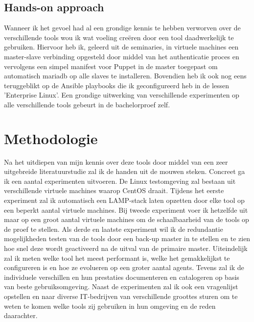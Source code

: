 \documentclass[fleqn,10pt]{voorstel}
\begin{document}
\subsection{Hands-on approach}
Wanneer ik het gevoel had al een grondige kennis te hebben verworven over de verschillende tools wou ik wat voeling creëren door een tool daadwerkelijk te gebruiken. Hiervoor heb ik, geleerd uit de seminaries, in virtuele machines een master-slave verbinding opgesteld door middel van het authenticatie proces en vervolgens een simpel manifest voor Puppet in de master toegepast om automatisch mariadb op alle slaves te installeren. Bovendien heb ik ook nog eens teruggeblikt op de Ansible playbooks die ik geconfigureerd heb in de lessen 'Enterprise Linux'. Een grondige uitwerking van verschillende experimenten op alle verschillende tools gebeurt in de bachelorproef zelf.


\section{Methodologie}
\label{sec:methodologie}

Na het uitdiepen van mijn kennis over deze tools door middel van een zeer uitgebreide literatuurstudie zal ik de handen uit de mouwen steken. Concreet ga ik een aantal experimenten uitvoeren. De Linux testomgeving zal bestaan uit verschillende virtuele machines waarop CentOS draait. Tijdens het eerste experiment zal ik automatisch een LAMP-stack laten opzetten door elke tool op een beperkt aantal virtuele machines. Bij tweede experiment voer ik hetzelfde uit maar op een groot aantal virtuele machines om de schaalbaarheid van de tools op de proef te stellen. Als derde en laatste experiment wil ik de redundantie mogelijkheden testen van de tools door een back-up master in te stellen en te zien hoe snel deze wordt geactiveerd na de uitval van de primaire master. Uiteindelijk zal ik meten welke tool het meest performant is, welke het gemakkelijkst te configureren is en hoe ze evolueren op een groter aantal agents. Tevens zal ik de individuele verschillen en hun prestaties documenteren en catalogeren op basis van beste gebruiksomgeving. Naast de experimenten zal ik ook een vragenlijst opstellen en naar diverse IT-bedrijven van verschillende groottes sturen om te weten te komen welke tools zij gebruiken in hun omgeving en de reden daarachter.
\end{document}
